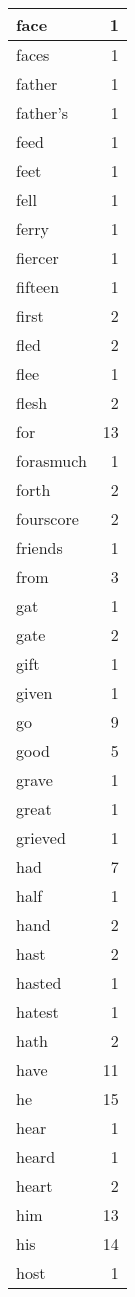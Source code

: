 \begin{center}
\begin{longtable}{l|r}
face & 1 \\ \hline
faces & 1 \\ \hline
father & 1 \\ \hline
father's & 1 \\ \hline
feed & 1 \\ \hline
feet & 1 \\ \hline
fell & 1 \\ \hline
ferry & 1 \\ \hline
fiercer & 1 \\ \hline
fifteen & 1 \\ \hline
first & 2 \\ \hline
fled & 2 \\ \hline
flee & 1 \\ \hline
flesh & 2 \\ \hline
for & 13 \\ \hline
forasmuch & 1 \\ \hline
forth & 2 \\ \hline
fourscore & 2 \\ \hline
friends & 1 \\ \hline
from & 3 \\ \hline
gat & 1 \\ \hline
gate & 2 \\ \hline
gift & 1 \\ \hline
given & 1 \\ \hline
go & 9 \\ \hline
good & 5 \\ \hline
grave & 1 \\ \hline
great & 1 \\ \hline
grieved & 1 \\ \hline
had & 7 \\ \hline
half & 1 \\ \hline
hand & 2 \\ \hline
hast & 2 \\ \hline
hasted & 1 \\ \hline
hatest & 1 \\ \hline
hath & 2 \\ \hline
have & 11 \\ \hline
he & 15 \\ \hline
hear & 1 \\ \hline
heard & 1 \\ \hline
heart & 2 \\ \hline
him & 13 \\ \hline
his & 14 \\ \hline
host & 1 \\ \hline

\end{longtable}
\end{center}
